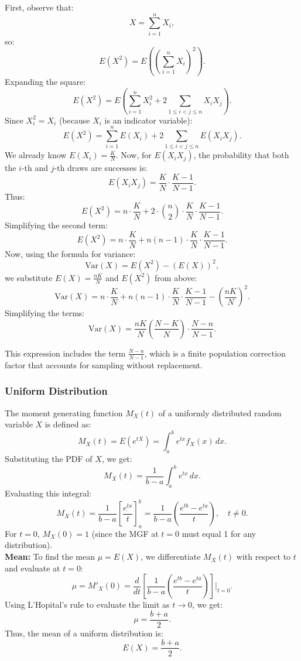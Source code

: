 First, observe that:
\[
X = \sum_{i=1}^{n} X_i,
\]
so:
\[
E(X^2) = E\left( \left( \sum_{i=1}^{n} X_i \right)^2 \right).
\]
Expanding the square:
\[
E(X^2) = E\left( \sum_{i=1}^{n} X_i^2 + 2 \sum_{1 \leq i < j \leq n} X_i X_j \right).
\]
Since \( X_i^2 = X_i \) (because \( X_i \) is an indicator variable):
\[
E(X^2) = \sum_{i=1}^{n} E(X_i) + 2 \sum_{1 \leq i < j \leq n} E(X_i X_j).
\]
We already know \( E(X_i) = \frac{K}{N} \). Now, for \( E(X_i X_j) \), the probability that both the \( i \)-th and \( j \)-th draws are successes is:
\[
E(X_i X_j) = \frac{K}{N} \cdot \frac{K-1}{N-1}.
\]
Thus:
\[
E(X^2) = n \cdot \frac{K}{N} + 2 \cdot \binom{n}{2} \cdot \frac{K}{N} \cdot \frac{K-1}{N-1}.
\]
Simplifying the second term:
\[
E(X^2) = n \cdot \frac{K}{N} + n(n-1) \cdot \frac{K}{N} \cdot \frac{K-1}{N-1}.
\]
Now, using the formula for variance:
\[
\text{Var}(X) = E(X^2) - (E(X))^2,
\]
we substitute \( E(X) = \frac{nK}{N} \) and \( E(X^2) \) from above:
\[
\text{Var}(X) = n \cdot \frac{K}{N} + n(n-1) \cdot \frac{K}{N} \cdot \frac{K-1}{N-1} - \left( \frac{nK}{N} \right)^2.
\]
Simplifying the terms:
\[
\text{Var}(X) = \frac{nK}{N} \left( \frac{N-K}{N} \right) \cdot \frac{N-n}{N-1}.
\]

This expression includes the term \( \frac{N - n}{N - 1} \), which is a finite population correction factor that accounts for sampling without replacement.

\subsubsection{Uniform Distribution}

The moment generating function \( M_X(t) \) of a uniformly distributed random variable \( X \) is defined as:
\[
M_X(t) = E\left(e^{tX}\right) = \int_a^b e^{tx} f_X(x) \, dx.
\]
Substituting the PDF of \( X \), we get:
\[
M_X(t) = \frac{1}{b-a} \int_a^b e^{tx} \, dx.
\]
Evaluating this integral:
\[
M_X(t) = \frac{1}{b-a} \left[ \frac{e^{tx}}{t} \right]_a^b = \frac{1}{b-a} \left( \frac{e^{tb} - e^{ta}}{t} \right), \quad t \neq 0.
\]
For \( t = 0 \), \( M_X(0) = 1 \) (since the MGF at \( t = 0 \) must equal 1 for any distribution).\\

\textbf{Mean:} To find the mean \( \mu = E(X) \), we differentiate \( M_X(t) \) with respect to \( t \) and evaluate at \( t = 0 \):
\[
\mu = M'_X(0) = \frac{d}{dt} \left[ \frac{1}{b-a} \left( \frac{e^{tb} - e^{ta}}{t} \right) \right] \bigg|_{t=0}.
\]
Using L'Hopital's rule to evaluate the limit as \( t \to 0 \), we get:
\[
\mu = \frac{b + a}{2}.
\]
Thus, the mean of a uniform distribution is:
\[
E(X) = \frac{b + a}{2}.
\]

